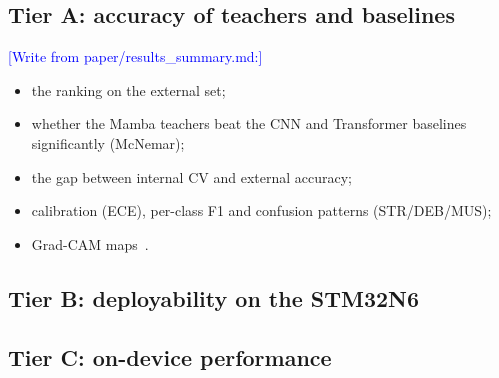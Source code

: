\documentclass[preprint,12pt]{elsarticle}
\newcommand{\todo}[1]{\textcolor{blue}{[#1]}}
\begin{document}
\subsection{Tier A: accuracy of teachers and baselines}
\begin{table}[t]\centering\small
\caption{Classification on CRC-VAL-HE-7K (external) and internal 3-fold CV, mean $\pm$ SD over all runs (3 folds $\times$ seeds; ``runs'' gives the count). Best external accuracy in bold. $p$: exact McNemar test against the distilled student on the external set. Params and GMACs at $224^2$ with a 9-class head; $^{\dagger}$GMACs as reported by the original authors, because fvcore cannot count selective-scan kernels.}
\label{tab:tierA}

\end{table}
\todo{Write from paper/results\_summary.md:}
\begin{itemize}
\item the ranking on the external set;
\item whether the Mamba teachers beat the CNN and Transformer baselines significantly (McNemar);
\item the gap between internal CV and external accuracy;
\item calibration (ECE), per-class F1 and confusion patterns (STR/DEB/MUS);
\item Grad-CAM maps~\cite{selvaraju2017gradcam}.
\end{itemize}

\subsection{Tier B: deployability on the STM32N6}
\begin{table}[t]\centering\small
\caption{ST Edge AI Core analysis for the STM32N6 Neural-ART target (INT8, $224^2$).}
\label{tab:tierB}

\end{table}

\subsection{Tier C: on-device performance}
\begin{table}[t]\centering\small
\caption{Measured on STM32N6570-DK (CPU 800\,MHz, NPU \resNPUMHz\,MHz, ST Edge AI Core v\resSTVersion). Accuracy on CRC-VAL-HE-7K; $\Delta$ in percentage points; Agree: top-1 agreement between board and host INT8 predictions on 1\,000 external patches.}
\label{tab:tierC}

\end{table}
\end{document}
